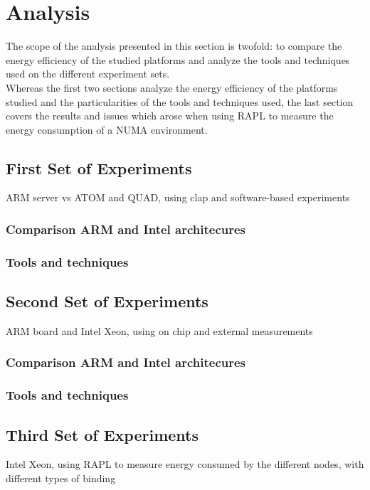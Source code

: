 \chapter{Analysis}



The scope of the analysis presented in this section is twofold: to compare the
energy efficiency of the studied platforms and analyze the tools and techniques 
used on the different experiment sets. 
\\
Whereas the first two sections analyze the energy efficiency of the platforms
studied and the particularities of the tools and techniques used, the last section
covers the results and issues which arose when using RAPL to measure the energy 
consumption of a NUMA environment.

\section{First Set of Experiments}
ARM server vs ATOM and QUAD, using clap and software-based experiments

\subsection{Comparison ARM and Intel architecures}
\subsection{Tools and techniques}

\section{Second Set of Experiments}
ARM board and Intel Xeon, using on chip and external measurements

\subsection{Comparison ARM and Intel architecures}
\subsection{Tools and techniques}


\section{Third Set of Experiments}
Intel Xeon, using RAPL to measure energy consumed by the different nodes, with
different types of binding

